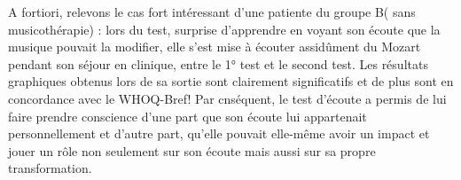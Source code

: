 \begin{enumerate}
  A fortiori, relevons le cas fort intéressant  d'une patiente du groupe B( sans
  musicothérapie) : lors du test, surprise d'apprendre en voyant son écoute que la musique pouvait la modifier, elle s'est mise à écouter assidûment du Mozart pendant son séjour en clinique, entre le 1° test et le second test.  Les résultats
  graphiques obtenus lors de sa sortie sont clairement significatifs
  et de plus sont en concordance avec le WHOQ-Bref!  
  Par cnséquent, le test d'écoute a permis de lui faire prendre conscience d'une part que son écoute lui appartenait personnellement et d'autre part, qu'elle pouvait elle-même avoir un impact et jouer un rôle non seulement sur son écoute mais aussi sur sa propre  transformation.



   
   
   
   
  \end{enumerate}










